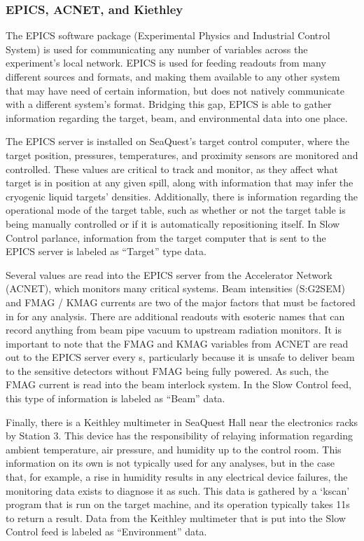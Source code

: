 \subsubsection{EPICS, ACNET, and Kiethley}

The EPICS software package (Experimental Physics and Industrial Control System) is used for communicating any number of variables across the experiment's local network. EPICS is used for feeding readouts from many different sources and formats, and making them available to any other system that may have need of certain information, but does not natively communicate with a different system's format. Bridging this gap, EPICS is able to gather information regarding the target, beam, and environmental data into one place.

The EPICS server is installed on SeaQuest's target control computer, where the target position, pressures, temperatures, and proximity sensors are monitored and controlled. These values are critical to track and monitor, as they affect what target is in position at any given spill, along with information that may infer the cryogenic liquid targets' densities. Additionally, there is information regarding the operational mode of the target table, such as whether or not the target table is being manually controlled or if it is automatically repositioning itself. In Slow Control parlance, information from the target computer that is sent to the EPICS server is labeled as ``Target'' type data.

Several values are read into the EPICS server from the Accelerator Network (ACNET), which monitors many critical systems. Beam intensities (S:G2SEM) and FMAG / KMAG currents are two of the major factors that must be factored in for any analysis. There are additional readouts with esoteric names that can record anything from beam pipe vacuum to upstream radiation monitors. It is important to note that the FMAG and KMAG variables from ACNET are read out to the EPICS server every \unit[3]{s}, particularly because it is unsafe to deliver beam to the sensitive detectors without FMAG being fully powered. As such, the FMAG current is read into the beam interlock system. In the Slow Control feed, this type of information is labeled as ``Beam'' data.

Finally, there is a Keithley multimeter \CN in SeaQuest Hall near the electronics racks by Station 3. This device has the responsibility of relaying information regarding ambient temperature, air pressure, and humidity up to the control room. This information on its own is not typically used for any analyses, but in the case that, for example, a rise in humidity results in any electrical device failures, the monitoring data exists to diagnose it as such. This data is gathered by a `kscan' program that is run on the target machine, and its operation typically takes 11s to return a result. Data from the Keithley multimeter that is put into the Slow Control feed is labeled as ``Environment'' data.

